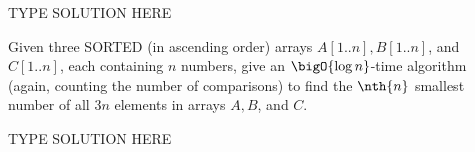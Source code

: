 \documentclass[draft]{article}
\begin{document}
\begin{solution}
    TYPE SOLUTION HERE
\end{solution}

\begin{exercise}{5.9}
    Given three SORTED (in ascending order) arrays $A[1..n], B[1..n]$,
    and $C[1..n]$, each containing $n$ numbers, give an $\bigO{\log n}$-time algorithm (again, counting the number of comparisons) to find the $\nth{n}$ smallest number of all $3n$
    elements in arrays $A, B$, and $C$.
\end{exercise}

\begin{solution}
    TYPE SOLUTION HERE
\end{solution}
\end{document}
